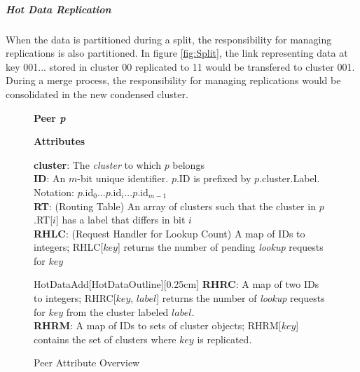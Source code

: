 \documentclass[12pt]{report}
\theoremstyle{plain}
\newcounter{highlight}
\begin{document}
			\subparagraph*{Hot Data Replication}	
			When the data is partitioned during a split, the responsibility for managing replications is also partitioned. In figure \ref{fig:Split}, 
			the link representing data at key 001... stored in cluster 00 replicated to 11 would be transfered to cluster 001.
			During a merge process, the responsibility for managing replications would be consolidated in the new condensed cluster.

			    \begin{figure}[h]
			    		\onehalfspacing
					\begin{lrbox}{\mybox}
					\hspace*{-0.8cm}
					\begin{minipage}{0.91\columnwidth}
						\linespread{1.5}
				   		\textbf{\large{Peer \textit{p}}}
						\vspace{0.2cm}
						\begin{addmargin}[1em]{0em}
							\textbf{Attributes}
							\begin{addmargin}[1em]{0em}
								\textbf{cluster}: The \textit{cluster} to which $p$ belongs\\
								\textbf{ID}: An $m$-bit unique identifier. $p$.ID is prefixed by $p$.cluster.Label. Notation:
								$p$.id$_0...p$.id$_{i}...p$.id$_{m-1}$\\
								\textbf{RT}: (Routing Table) An array of clusters such that the cluster in $p$.RT[$i$] has a label that differs in bit $i$\\
								\textbf{RHLC}: (Request Handler for Lookup Count) A map of IDs to integers; 
								RHLC[$key$] returns the number of pending \textit{lookup} requests for $key$\\
								\begin{highlight}{HotDataAdd}[HotDataOutline][0.25cm]%
									\vspace{-0.5em}
									\textbf{RHRC}: A map of two IDs to integers; RHRC[$key$, $label$] returns the number of \textit{lookup} requests for $key$  											from the cluster labeled $label$.\\
									\textbf{RHRM}: A map of IDs to sets of cluster objects; RHRM[$key$] contains the set of clusters where $key$ is replicated.
									\vspace{-0.4em}\\
								\end{highlight}
								\vspace{-1em}
								
							\end{addmargin}
						\end{addmargin}
					\end{minipage}
					\end{lrbox}
					\framebox[\columnwidth]{\hspace*{15pt}\usebox\mybox\par}
					\caption{Peer Attribute Overview}
				    \label{fig:PEERDEF}
			    \end{figure}
\end{document}
